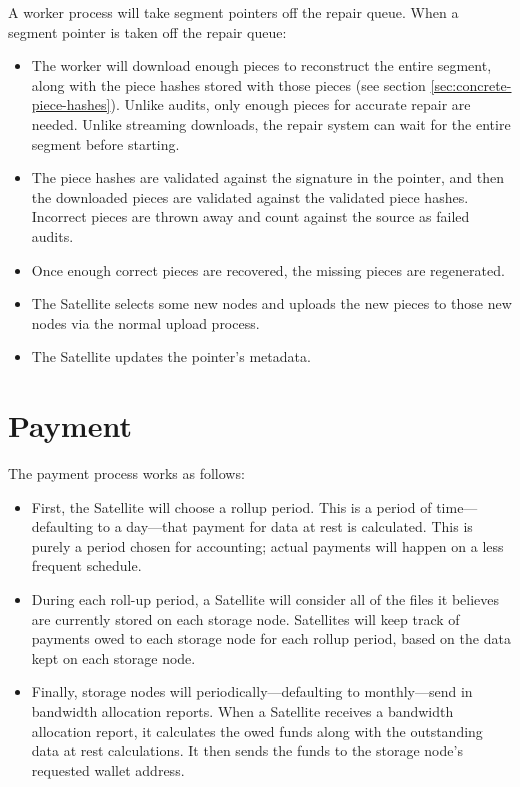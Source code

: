 \documentclass[8pt,fleqn,openany]{book}
\begin{document}
A worker process will take segment pointers off the repair queue.
When a segment pointer is taken off the repair queue:

\begin{itemize}
\item The worker will download enough pieces to reconstruct the entire segment,
  along with the piece hashes stored with those pieces
  (see section \ref{sec:concrete-piece-hashes}).
  Unlike audits, only enough pieces for accurate repair are needed.
  Unlike streaming downloads, the repair system can wait for the entire segment
  before starting.
\item The piece hashes are validated against the signature in the pointer, and
  then the downloaded pieces are validated against the validated piece hashes.
  Incorrect pieces are thrown away and count against the source as failed audits.
\item Once enough correct pieces are recovered, the missing pieces are
  regenerated.
\item The Satellite selects some new nodes and uploads the new pieces to
  those new nodes via the normal upload process.
\item The Satellite updates the pointer's metadata.
\end{itemize}

\section{Payment}

The payment process works as follows:

\begin{itemize}
\item First, the Satellite will choose a rollup period. This is a period of
  time---defaulting to a day---that payment for data at rest is calculated.
  This is purely a period chosen for accounting; actual payments will happen
  on a less frequent schedule.
\item During each roll-up period, a Satellite will consider all of the files it
  believes are currently stored on each storage node. Satellites will keep track
of payments owed to each storage node for each rollup period, based on
the data kept on each storage node.
\item Finally, storage nodes will periodically---defaulting to monthly---send in
  bandwidth allocation reports. When a
  Satellite receives a bandwidth allocation report, it calculates the owed
  funds along with the outstanding data at rest calculations. It then sends the
  funds to the storage node's requested wallet address.
\end{itemize}
\end{document}
